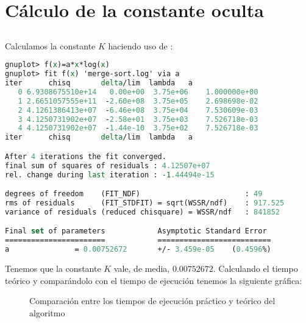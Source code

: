\section{Cálculo de la constante oculta}\label{eficiencia-oculta}

\subsection{}\label{eficiencia-oculta-mergesort}

Calculamos la constante $K$ haciendo uso de :

\begin{lstlisting}[language=tcl]
gnuplot> f(x)=a*x*log(x)
gnuplot> fit f(x) 'merge-sort.log' via a
iter      chisq       delta/lim  lambda   a
   0 6.9308675510e+14   0.00e+00  3.75e+06    1.000000e+00
   1 2.6651057555e+11  -2.60e+08  3.75e+05    2.698698e-02
   2 4.1261386413e+07  -6.46e+08  3.75e+04    7.530609e-03
   3 4.1250731902e+07  -2.58e+01  3.75e+03    7.526718e-03
   4 4.1250731902e+07  -1.44e-10  3.75e+02    7.526718e-03
iter      chisq       delta/lim  lambda   a

After 4 iterations the fit converged.
final sum of squares of residuals : 4.12507e+07
rel. change during last iteration : -1.44494e-15

degrees of freedom    (FIT_NDF)                        : 49
rms of residuals      (FIT_STDFIT) = sqrt(WSSR/ndf)    : 917.525
variance of residuals (reduced chisquare) = WSSR/ndf   : 841852

Final set of parameters            Asymptotic Standard Error
=======================            ==========================
a               = 0.00752672       +/- 3.459e-05    (0.4596%)
\end{lstlisting}

Tenemos que la constante $K$ vale, de media, $0.00752672$.
Calculando el tiempo teórico y comparándolo con el tiempo de ejecución tenemos la siguiente gráfica:

\begin{figure}[h]
\begin{center}
\end{center}
\caption{Comparación entre los tiempos de ejecución práctico y teórico del algoritmo }
\end{figure}


